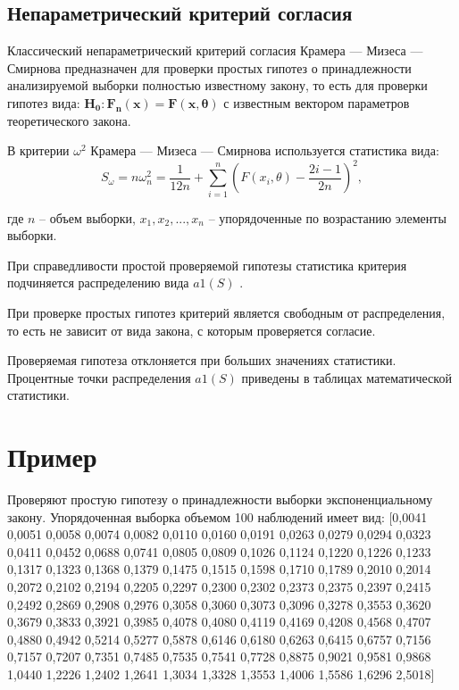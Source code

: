 \documentclass[a4]{article}
\begin{document}
\subsection{ Непараметрический критерий согласия}
Классический непараметрический критерий согласия Крамера — Мизеса — Смирнова предназначен для проверки простых гипотез о принадлежности анализируемой выборки полностью известному закону, то есть для проверки гипотез вида:
 $\mathbf{ H_{0} : F_{n}(x) = F(x, \theta) }$ с известным вектором параметров теоретического закона.

В критерии $\omega^2$ Крамера — Мизеса — Смирнова используется статистика вида:
\begin{equation}\label{formula3}
    S_{\omega} = n\omega^2_{n} = \frac{1}{12n} + \sum_{i = 1}^n \left( F(x_{i}, \theta) - \frac{2i - 1}{2n}\right)^2,
\end{equation}

где $n$ – объем выборки, $x_{1},x_{2},...,x_{n}$ – упорядоченные по возрастанию элементы выборки.

При справедливости простой проверяемой гипотезы статистика критерия подчиняется распределению вида $ a1(S)$\cite{8_1} .

При проверке простых гипотез критерий является свободным от распределения, то есть не зависит от вида закона, с которым проверяется согласие.

Проверяемая гипотеза отклоняется при больших значениях статистики. Процентные точки распределения $a1(S)$  приведены в таблицах математической статистики\cite{8_1}.

\newpage
\section{Пример}
Проверяют простую гипотезу о принадлежности выборки экспоненциальному закону. Упорядоченная выборка объемом 100 наблюдений имеет вид:
[0,0041
0,0051
0,0058
0,0074
0,0082
0,0110
0,0160
0,0191
0,0263
0,0279
0,0294
0,0323
0,0411
0,0452
0,0688
0,0741
0,0805
0,0809
0,1026
0,1124
0,1220
0,1226
0,1233
0,1317
0,1323
0,1368
0,1379
0,1475
0,1515
0,1598
0,1710
0,1789
0,2010
0,2014
0,2072
0,2102
0,2194
0,2205
0,2297
0,2300
0,2302
0,2373
0,2375
0,2397
0,2415
0,2492
0,2869
0,2908
0,2976
0,3058
0,3060
0,3073
0,3096
0,3278
0,3553
0,3620
0,3679
0,3833
0,3921
0,3985
0,4078
0,4080
0,4119
0,4169
0,4208
0,4568
0,4707
0,4880
0,4942
0,5214
0,5277
0,5878
0,6146
0,6180
0,6263
0,6415
0,6757
0,7156
0,7157
0,7207
0,7351
0,7485
0,7535
0,7541
0,7728
0,8875
0,9021
0,9581
0,9868
1,0440
1,2226
1,2402
1,2641
1,3034
1,3328
1,3553
1,4006
1,5586
1,6296
2,5018]
\end{document}
